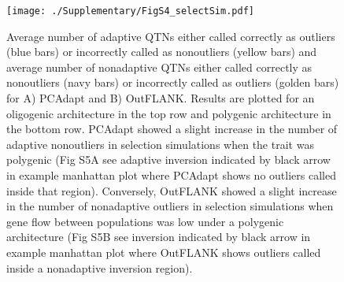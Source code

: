 \documentclass[10pt, scrartlc]{article}
\begin{document}
\begin{figure}[h]
	\begin{center}
		\texttt{[image: ./Supplementary/FigS4\_selectSim.pdf]}
	\end{center}
	\caption[Genome Scan Performance for Selection Simulations]{Average number of adaptive QTNs either called correctly as outliers (blue bars) or incorrectly called as nonoutliers (yellow bars) and average number of nonadaptive QTNs either called correctly as nonoutliers (navy bars) or incorrectly called as outliers (golden bars) for A) PCAdapt and B) OutFLANK. Results are plotted for an oligogenic architecture in the top row and polygenic architecture in the bottom row. PCAdapt showed a slight increase in the number of adaptive nonoutliers in selection simulations when the trait was polygenic (Fig S5A see adaptive inversion indicated by black arrow in example manhattan plot where PCAdapt shows no outliers called inside that region). Conversely, OutFLANK showed a slight increase in the number of nonadaptive outliers in selection simulations when gene flow between populations was low under a polygenic architecture (Fig S5B see inversion indicated by black arrow in example manhattan plot where OutFLANK shows outliers called inside a nonadaptive inversion region). }
\end{figure}

\clearpage
\newpage
\end{document}
